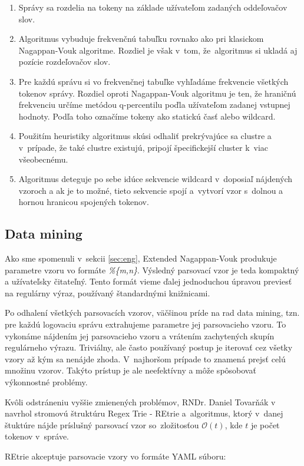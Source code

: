 \begin{enumerate}
 \item Správy sa rozdelia na tokeny na základe užívateľom zadaných oddeľovačov slov.
 \item Algoritmus vybuduje frekvenčnú tabuľku rovnako ako pri klasickom Nagappan-Vouk algoritme. Rozdiel je však v~tom, že~algoritmus si ukladá aj pozície rozdeľovačov slov.
 \item Pre každú správu si vo frekvenčnej tabuľke vyhľadáme frekvencie všetkých tokenov správy. Rozdiel oproti Nagappan-Vouk algoritmu je ten, že hraničnú frekvenciu určíme metódou q-per\-centilu poďla užívateľom zadanej vstupnej hodnoty. Podľa toho označíme tokeny ako statickú časť alebo wildcard.
 \item Použitím heuristiky algoritmus skúsi odhaliť prekrývajúce sa clustre a v~prípade, že také clustre existujú, pripojí špecifickejší cluster k~viac všeobecnému.
 \item Algoritmus deteguje po sebe idúce sekvencie wildcard v~doposiaľ nájdených vzoroch a ak je to možné, tieto sekvencie spojí a~vytvorí
 vzor s~dolnou a hornou hranicou spojených tokenov.
\end{enumerate}

\subsection{Data mining}
\label{sec:data-mining}
Ako sme spomenuli v~sekcii \ref{sec:eng}, Extended Nagappan-Vouk produkuje parametre vzoru vo formáte \emph{\%\{m,n\}}. Výsledný parsovací vzor je teda kompaktný a užívateľsky čitateľný.  Tento formát vieme ďalej jednoduchou úpravou previesť na regulárny výraz, používaný štandardnými knižnicami.
\par Po odhalení všetkých parsovacích vzorov, väčšinou príde na rad data mining, tzn. pre každú logovaciu správu extrahujeme parametre jej parsovacieho vzoru. To vykonáme nájdením jej parsovacieho vzoru a vrátením zachytených skupín regulárneho výrazu. Triviálny, ale často používaný postup je iterovať cez všetky vzory až kým sa nenájde zhoda. V~najhoršom prípade to znamená prejsť celú množinu vzorov. Takýto prístup je ale neefektívny a môže spôsobovať výkonnostné problémy.
\par Kvôli odstráneniu vyššie zmienených problémov, RNDr. Daniel Tovarňák v~\parencite{regextrie} navrhol stromovú štruktúru Regex Trie - REtrie a~algoritmus, ktorý v~danej štuktúre nájde príslušný parsovací vzor so~zložitosťou $\mathcal{O}(t)$, kde $t$ je počet tokenov v~správe.
\par REtrie akceptuje parsovacie vzory vo formáte YAML súboru:

